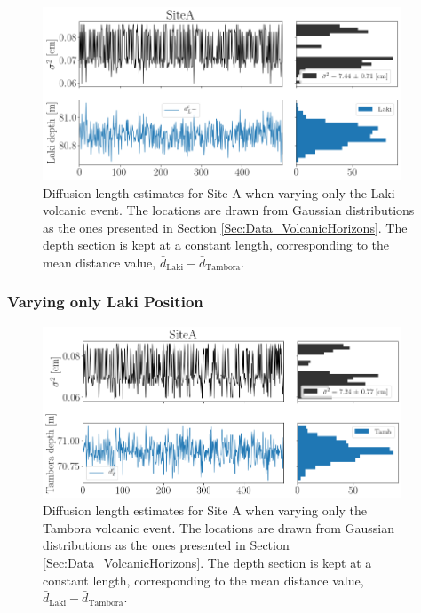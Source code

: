 \documentclass[../../CompleteThesis2/Complete_2ndDraft]{subfiles}
\begin{document}
\begin{figure}[h]
	\centering
	\includegraphics[width=0.95\textwidth]{SiteA_Vary_Lonly.png}
	\caption[Diffusion Length Variations, Varying only Laki]{\small Diffusion length estimates for Site A when varying only the Laki volcanic event. The locations are drawn from Gaussian distributions as the ones presented in Section \ref{Sec:Data_VolcanicHorizons}. The depth section is kept at a constant length, corresponding to the mean distance value, $\bar{d}_{\text{Laki}}-\bar{d}_{\text{Tambora}}$.}
	\label{fig:SiteA_Vary_Tonly}
\end{figure}



\subsubsection[Vary L]{Varying only Laki Position}
\label{Subsubsec:Method_TestStab_LTlocations_L}

\begin{figure}[h]
	\centering
	\includegraphics[width=0.95\textwidth]{SiteA_Vary_Tonly.png}
	\caption[Diffusion Length Variations, Varying only Tambora]{\small Diffusion length estimates for Site A when varying only the Tambora volcanic event. The locations are drawn from Gaussian distributions as the ones presented in Section \ref{Sec:Data_VolcanicHorizons}. The depth section is kept at a constant length, corresponding to the mean distance value, $\bar{d}_{\text{Laki}}-\bar{d}_{\text{Tambora}}$.}
	\label{fig:SiteA_Vary_Lonly}
\end{figure}
\end{document}
